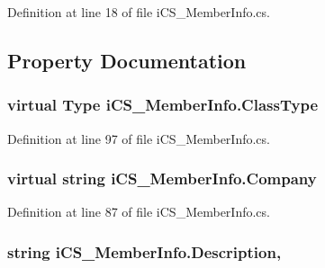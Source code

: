 Definition at line 18 of file i\+C\+S\+\_\+\+Member\+Info.\+cs.



\subsection{Property Documentation}
\hypertarget{classi_c_s___member_info_a42fc18c409fa6a2ba0ec245ffa039bbb}{
\subsubsection[{Class\+Type}]{\setlength{\rightskip}{0pt plus 5cm}virtual {\bf Type} i\+C\+S\+\_\+\+Member\+Info.\+Class\+Type\hspace{0.3cm}{\ttfamily [get]}}}\label{classi_c_s___member_info_a42fc18c409fa6a2ba0ec245ffa039bbb}


Definition at line 97 of file i\+C\+S\+\_\+\+Member\+Info.\+cs.

\hypertarget{classi_c_s___member_info_a546e455e47aa7c708b1d82cb34d1c5cd}{
\subsubsection[{Company}]{\setlength{\rightskip}{0pt plus 5cm}virtual string i\+C\+S\+\_\+\+Member\+Info.\+Company\hspace{0.3cm}{\ttfamily [get]}}}\label{classi_c_s___member_info_a546e455e47aa7c708b1d82cb34d1c5cd}


Definition at line 87 of file i\+C\+S\+\_\+\+Member\+Info.\+cs.

\hypertarget{classi_c_s___member_info_a979bd1197412783cc1e95f7e771c9f28}{
\subsubsection[{Description}]{\setlength{\rightskip}{0pt plus 5cm}string i\+C\+S\+\_\+\+Member\+Info.\+Description\hspace{0.3cm}{\ttfamily [get]}, {\ttfamily [set]}}}\label{classi_c_s___member_info_a979bd1197412783cc1e95f7e771c9f28}


